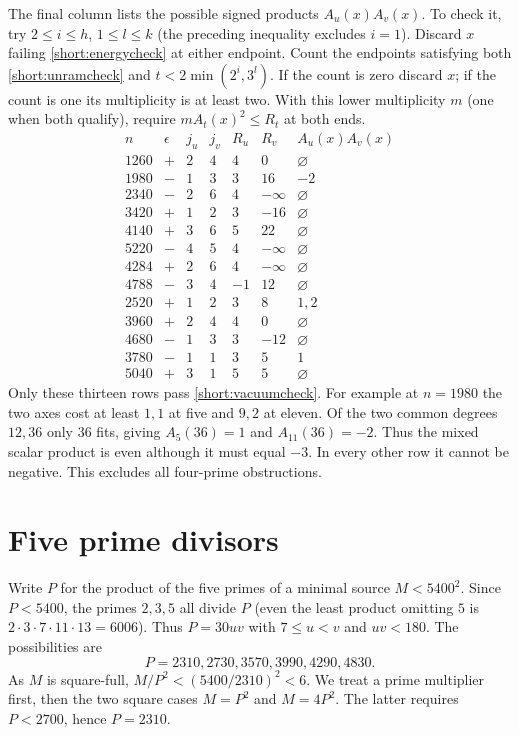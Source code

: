 \documentclass[11pt,a4paper]{article}
\numberwithin{equation}{section}
\theoremstyle{remark}
\begin{document}
The final column lists the possible signed products $A_u(x)A_v(x)$.
To check it, try $2\le i\le h$, $1\le l\le k$ (the preceding
inequality excludes $i=1$). Discard $x$ failing \eqref{short:energycheck}
at either endpoint. Count the endpoints satisfying both
\eqref{short:unramcheck} and $t<2\min(2^i,3^l)$. If the count is
zero discard $x$; if the count is one its multiplicity is at least
two. With this lower multiplicity $m$ (one when both qualify), require
$m A_t(x)^2\le R_t$ at both ends.
\[
\begin{array}{r|r|rr|rr|l}
 n&\epsilon&j_u&j_v&R_u&R_v&A_u(x)A_v(x)\\\hline
1260&+&2&4&4&0&\varnothing\\
1980&-&1&3&3&16&-2\\
2340&-&2&6&4&-\infty&\varnothing\\
3420&+&1&2&3&-16&\varnothing\\
4140&+&3&6&5&22&\varnothing\\
5220&-&4&5&4&-\infty&\varnothing\\
4284&+&2&6&4&-\infty&\varnothing\\
4788&-&3&4&-1&12&\varnothing\\
2520&+&1&2&3&8&1,2\\
3960&+&2&4&4&0&\varnothing\\
4680&-&1&3&3&-12&\varnothing\\
3780&-&1&1&3&5&1\\
5040&+&3&1&5&5&\varnothing
\end{array}
\]
Only these thirteen rows pass \eqref{short:vacuumcheck}. For example
at $n=1980$ the two axes cost at least $1,1$ at five and $9,2$ at
eleven. Of the two common degrees $12,36$ only $36$ fits, giving
$A_5(36)=1$ and $A_{11}(36)=-2$. Thus the mixed scalar product is
even although it must equal $-3$. In every other row it cannot be
negative. This excludes all four-prime obstructions.

\section{Five prime divisors}\label{sec:short-five}
Write $P$ for the product of the five primes of a minimal source $M<5400^2$.
Since $P<5400$, the primes $2,3,5$ all divide $P$ (even the least product
omitting $5$ is $2\cdot3\cdot7\cdot11\cdot13=6006$). Thus $P=30uv$ with
$7\le u<v$ and $uv<180$. The possibilities are
\[
              P=2310,2730,3570,3990,4290,4830 .
\]
As $M$ is square-full, $M/P^2<(5400/2310)^2<6$. We treat a prime
multiplier first, then the two square cases $M=P^2$ and $M=4P^2$.
The latter requires $P<2700$, hence $P=2310$.
\end{document}
